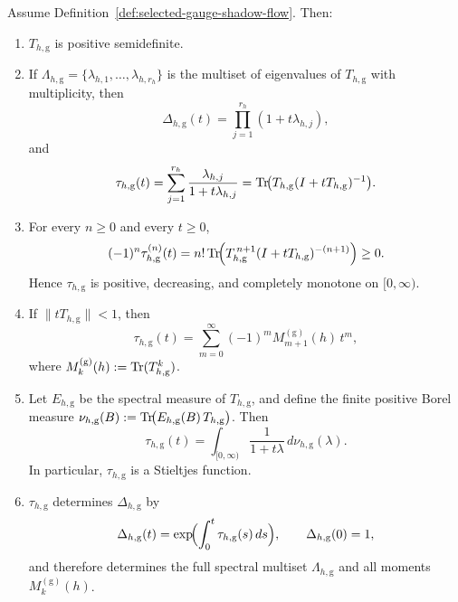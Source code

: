 \begin{theorem}
\label{thm:exact-euclidean-gauge-shadow-flow}
Assume Definition~\ref{def:selected-gauge-shadow-flow}. Then:

\begin{enumerate}[label=\textup{(\roman*)}]
\item $T_{h,\mathrm g}$ is positive semidefinite.

\item If
$\Lambda_{h,\mathrm g}
=\{\lambda_{h,1},\dots,\lambda_{h,r_h}\}$
is the multiset of eigenvalues of $T_{h,\mathrm g}$ with multiplicity,
then
\[
\Delta_{h,\mathrm g}(t)=\prod_{j=1}^{r_h}(1+t\lambda_{h,j}),
\]
and
\[
\tau_{h,\mathrm g}(t)
=
\sum_{j=1}^{r_h}\frac{\lambda_{h,j}}{1+t\lambda_{h,j}}
=
\mathrm{Tr}\!\bigl(T_{h,\mathrm g}(I+tT_{h,\mathrm g})^{-1}\bigr).
\]

\item For every $n\ge 0$ and every $t\ge 0$,
\[
(-1)^n \tau_{h,\mathrm g}^{(n)}(t)
=
n!\,
\mathrm{Tr}\!\Bigl(
T_{h,\mathrm g}^{\,n+1}(I+tT_{h,\mathrm g})^{-(n+1)}
\Bigr)
\ge 0.
\]
Hence $\tau_{h,\mathrm g}$ is positive, decreasing, and completely
monotone on $[0,\infty)$.

\item If $\|tT_{h,\mathrm g}\|<1$, then
\[
\tau_{h,\mathrm g}(t)
=
\sum_{m=0}^{\infty}(-1)^m M_{m+1}^{(\mathrm g)}(h)\,t^m,
\]
where $M_k^{(\mathrm g)}(h):=\mathrm{Tr}(T_{h,\mathrm g}^k)$.

\item Let $E_{h,\mathrm g}$ be the spectral measure of $T_{h,\mathrm g}$,
and define the finite positive Borel measure
$\nu_{h,\mathrm g}(B)
:=\mathrm{Tr}\!\bigl(E_{h,\mathrm g}(B)\,T_{h,\mathrm g}\bigr)$.
Then
\[
\tau_{h,\mathrm g}(t)
=
\int_{[0,\infty)} \frac{1}{1+t\lambda}\,d\nu_{h,\mathrm g}(\lambda).
\]
In particular, $\tau_{h,\mathrm g}$ is a Stieltjes function.

\item $\tau_{h,\mathrm g}$ determines $\Delta_{h,\mathrm g}$ by
\[
\Delta_{h,\mathrm g}(t)
=
\exp\!\Bigl(\int_0^t \tau_{h,\mathrm g}(s)\,ds\Bigr),
\qquad
\Delta_{h,\mathrm g}(0)=1,
\]
and therefore determines the full spectral multiset
$\Lambda_{h,\mathrm g}$ and all moments $M_k^{(\mathrm g)}(h)$.
\end{enumerate}
\end{theorem}

